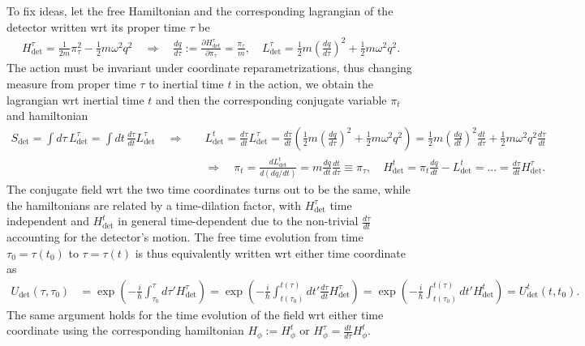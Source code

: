 \documentclass[../QFT_main.tex]{subfiles}
\begin{document}
\begin{mytheorem}
To fix ideas, let the free Hamiltonian and the corresponding lagrangian of the detector written wrt its proper time $\tau$ be
\begin{align}
    H^\tau_{\mathrm{det}} = \tfrac{1}{2m} \pi_\tau^2- \tfrac12 m\omega^2 q^2 \quad \Rightarrow\quad \tfrac{dq}{d\tau}:= \tfrac{\partial H^\tau_{\mathrm{det}}}{\partial \pi_\tau} = \tfrac{\pi_\tau}{m}, \quad L^\tau_{\mathrm{det}} = \tfrac12 m \left(\tfrac{dq}{d\tau}\right)^2 + \tfrac12 m\omega^2 q^2.
\end{align}
The action must be invariant under coordinate reparametrizations, thus changing measure from proper time $\tau$ to inertial time $t$ in the action, we obtain the lagrangian wrt inertial time $t$ and then the corresponding conjugate variable $\pi_t$ and hamiltonian
{\small
\begin{align}
    S_{\mathrm{det}} = \int d\tau\, L^\tau_{\mathrm{det}} = \int dt\,\tfrac{d\tau}{dt} L^\tau_{\mathrm{det}}
    \quad\Rightarrow\quad
    & L^t_{\mathrm{det}} = \tfrac{d\tau}{dt} L^\tau_{\mathrm{det}}=
    \tfrac{d\tau}{dt} \left(\tfrac12 m \left(\tfrac{dq}{d\tau}\right)^2 + \tfrac12 m\omega^2 q^2\right)
    =  \tfrac12 m \left(\tfrac{dq}{dt}\right)^2 \tfrac{dt}{d\tau} + \tfrac12 m\omega^2 q^2 \tfrac{d\tau}{dt}\\
    &\Rightarrow\quad  \pi_t = \tfrac{dL^t_{\mathrm{det}}}{d(dq/dt)} = m \tfrac{dq}{dt} \tfrac{dt}{d\tau}\equiv \pi_\tau,\quad
    H^t_{\mathrm{det}} = \pi_t \tfrac{dq}{dt} - L^t_{\mathrm{det}} =... = \tfrac{d\tau}{dt} H^\tau_{\mathrm{det}}.
\end{align}
}
The conjugate field wrt the two time coordinates turns out to be the same, while the hamiltonians are related by a time-dilation factor, with $H^\tau_{\mathrm{det}}$ time independent and $H_{\mathrm{det}}^t$ in general time-dependent due to the non-trivial $\frac{d\tau}{dt}$ accounting for the detector's motion.
The free time evolution from time $\tau_0= \tau(t_0)$ to $\tau=\tau(t)$ is thus equivalently written wrt either time coordinate as
{\small
\begin{align}
    U_{\mathrm{det}}(\tau,\tau_0) &= \exp\left(-\frac{i}{\hbar} \int_{\tau_0}^{\tau} d\tau' H_{\mathrm{det}}^\tau\right) = \exp\left(-\frac{i}{\hbar} \int_{t(\tau_0)}^{t(\tau)} dt' \tfrac{d\tau}{dt}H_{\mathrm{det}}^\tau\right) = \exp\left(-\frac{i}{\hbar} \int_{t(\tau_0)}^{t(\tau)} dt' H_{\mathrm{det}}^t\right) = U_{\mathrm{det}}^t(t,t_0).
\end{align}
}
The same argument holds for the time evolution of the field wrt either time coordinate using the corresponding hamiltonian $H_\phi:=H_\phi^t$ or $H_\phi^\tau = \tfrac{dt}{d\tau} H_\phi^t$.


\end{mytheorem}
\end{document}
